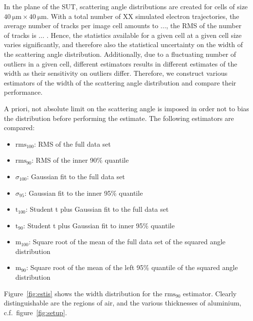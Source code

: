 \documentclass{PoS}
\newcommand{\rmshundred}{\ensuremath{\textrm{rms}_\textrm{100}}}
\newcommand{\rmsninety}{\ensuremath{\textrm{rms}_\textrm{90}}}
\newcommand{\gausshundred}{\ensuremath{\sigma_\textrm{100}}}
\newcommand{\gaussninety}{\ensuremath{\sigma_\textrm{95}}}
\newcommand{\studhundred}{\ensuremath{\textrm{t}_\textrm{100}}}
\newcommand{\studninety}{\ensuremath{\textrm{t}_\textrm{90}}}
\newcommand{\srmskhundred}{\ensuremath{\textrm{m}_\textrm{100}}}
\newcommand{\srmskninety}{\ensuremath{\textrm{m}_\textrm{90}}}
\begin{document}
In the plane of the SUT, scattering angle distributions are created for cells of size $\SI{40}{\um} \times \SI{40}{\um}$. 
With a total number of XX simulated electron trajectories, the average number of tracks per image cell amounts to ..., the RMS of the number of tracks is ... .
Hence, the statistics available for a given cell at a given cell size varies significantly, and therefore also the statistical uncertainty on the width of the scattering angle distribution. 
Additionally, due to a fluctuating number of outliers in a given cell, different estimators results in different estimates of the width as their sensitivity on outliers differ. 
Therefore, we construct various estimators of the width of the scattering angle distribution and compare their performance. 

A priori, not absolute limit on the scattering angle is imposed in order not to bias the distribution before performing the estimate. 
The following estimators are compared:
\begin{itemize}
 \item $\rmshundred$: RMS of the full data set
 \item $\rmsninety$: RMS of the inner 90\% quantile
 \item $\gausshundred$: Gaussian fit to the full data set
 \item $\gaussninety$: Gaussian fit to the inner 95\% quantile
 \item $\studhundred$: Student t plus Gaussian fit to the full data set
 \item $\studninety$: Student t plus Gaussian fit to inner 95\% quantile
 \item $\srmskhundred$: Square root of the mean of the full data set of the squared angle distribution
 \item $\srmskninety$: Square root of the mean of the left 95\% quantile of the squared angle distribution
 
\end{itemize}


%

Figure~\ref{fig:estis} shows the width distribution for the $\rmsninety$ estimator. 
Clearly distinguishable are the regions of air, and the various thicknesses of aluminium, c.f.\ figure~\ref{fig:setup}. 
\end{document}
